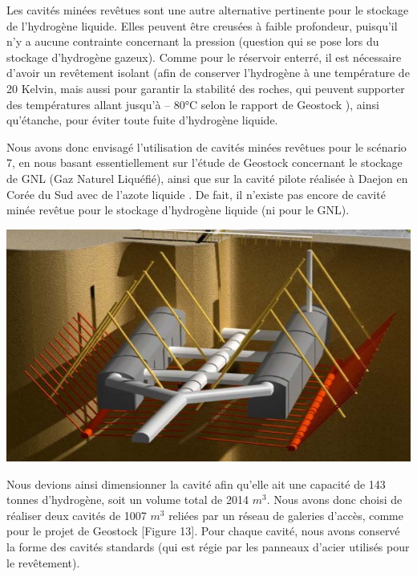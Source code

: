 \documentclass[11pt,french,a4paper]{article}
\begin{document}
\begin{multicols}{2}


Les cavités minées revêtues sont une autre alternative pertinente pour le stockage de l’hydrogène liquide. Elles peuvent être creusées à faible profondeur, puisqu’il n’y a aucune contrainte concernant la pression (question qui se pose lors du stockage d’hydrogène gazeux). Comme pour le réservoir enterré, il est nécessaire d’avoir un revêtement isolant (afin de conserver l’hydrogène à une température de 20 Kelvin, mais aussi pour garantir la stabilité des roches, qui peuvent supporter des températures allant jusqu’à – 80°C selon le rapport de Geostock \cite{Geostock_2022}), ainsi qu’étanche, pour éviter toute fuite d’hydrogène liquide.

Nous avons donc envisagé l’utilisation de cavités minées revêtues pour le scénario 7, en nous basant essentiellement sur l’étude de Geostock concernant le stockage de GNL (Gaz Naturel Liquéfié), ainsi que sur la cavité pilote réalisée à Daejon en Corée du Sud avec de l’azote liquide \cite{Nicolas_2008}. De fait, il n’existe pas encore de cavité minée revêtue pour le stockage d’hydrogène liquide (ni pour le GNL).

\begin{center}
  \includegraphics[width=\linewidth]{image/chap2/Figure 3.ii.2-1.png}
\end{center}

Nous devions ainsi dimensionner la cavité afin qu’elle ait une capacité de 143 tonnes d’hydrogène, soit un volume total de 2014 $m^3$. Nous avons donc choisi de réaliser deux cavités de 1007 $m^3$ reliées par un réseau de galeries d’accès, comme pour le projet de Geostock [Figure 13].
Pour chaque cavité, nous avons conservé la forme des cavités standards (qui est régie par les panneaux d’acier utilisés pour le revêtement).\\

\end{multicols}
\end{document}
